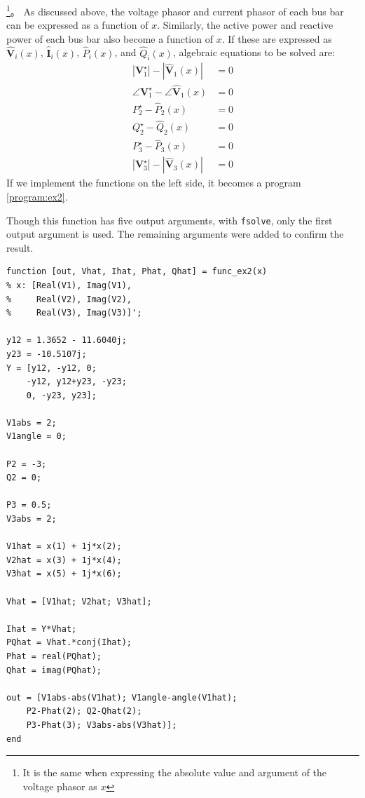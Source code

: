 \documentclass[tombow,dvipdfmx]{corona-a5-1.1}
\begin{document}
\begin{例}
\footnote{It is the same when expressing the absolute value and argument of the voltage phasor as $x$}。
As discussed above, the voltage phasor and current phasor of each bus bar can be expressed as a function of $x$.
Similarly, the active power and reactive power of each bus bar also become a function of $x$.
If these are expressed as $\hat{\bm V}_i(x)$, $\hat{\bm I}_i(x)$, $\hat{P}_i(x)$, and $\hat{Q}_i(x)$, algebraic equations to be solved are:
\begin{align*}
    |\bm V_1^{\star}|-|\hat{\bm V}_1(x)| &= 0\\
    \angle \bm V_1^{\star} - \angle \hat{\bm V}_1(x) &= 0\\
    P_2^{\star} -\hat P_2(x) &= 0\\
    Q_2^{\star} -\hat Q_2(x) &= 0\\
    P_3^{\star} -\hat P_3(x) &= 0\\
    |\bm V_3^{\star}|-|\hat{\bm V}_3(x)| &= 0
 \end{align*}
 If we implement the functions on the left side, it becomes a program \nobreak\ref{program:ex2}.

 Though this function has five output arguments, with \texttt{fsolve}, only the first output argument is used.
 The remaining arguments were added to confirm the result.


\smallskip
\begin{PROGRAMA}[count, title={func\_ex2.m}]\label{program:ex2}
\begin{verbatim}
function [out, Vhat, Ihat, Phat, Qhat] = func_ex2(x)
% x: [Real(V1), Imag(V1),
%     Real(V2), Imag(V2),
%     Real(V3), Imag(V3)]';

y12 = 1.3652 - 11.6040j;
y23 = -10.5107j;
Y = [y12, -y12, 0;
    -y12, y12+y23, -y23;
    0, -y23, y23];

V1abs = 2;
V1angle = 0;

P2 = -3;
Q2 = 0;

P3 = 0.5;
V3abs = 2;

V1hat = x(1) + 1j*x(2);
V2hat = x(3) + 1j*x(4);
V3hat = x(5) + 1j*x(6);

Vhat = [V1hat; V2hat; V3hat];

Ihat = Y*Vhat;
PQhat = Vhat.*conj(Ihat);
Phat = real(PQhat);
Qhat = imag(PQhat);

out = [V1abs-abs(V1hat); V1angle-angle(V1hat);
    P2-Phat(2); Q2-Qhat(2);
    P3-Phat(3); V3abs-abs(V3hat)];
end
\end{verbatim}
\end{PROGRAMA}


\end{例}
\end{document}
